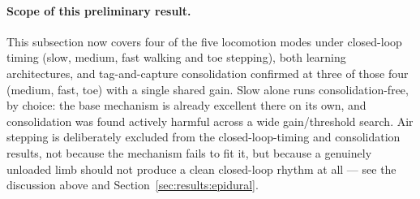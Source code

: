 \paragraph{Scope of this preliminary result.} This subsection now covers
four of the five locomotion modes under closed-loop timing (slow, medium,
fast walking and toe stepping), both learning architectures, and
tag-and-capture consolidation confirmed at three of those four (medium,
fast, toe) with a single shared gain. Slow alone runs consolidation-free,
by choice: the base mechanism is already excellent there on its own, and
consolidation was found actively harmful across a wide gain/threshold
search. Air stepping is deliberately excluded from the closed-loop-timing
and consolidation results, not because the mechanism fails to fit it, but
because a genuinely unloaded limb should not produce a clean closed-loop
rhythm at all --- see the discussion above and
Section~\ref{sec:results:epidural}. 
